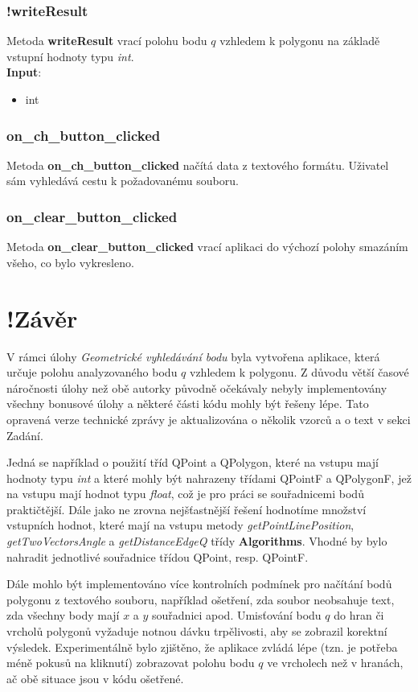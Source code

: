 \documentclass[a4paper, 12pt]{article}
\begin{document}
\subsubsection{!writeResult}
Metoda \textbf{writeResult} vrací polohu bodu $q$ vzhledem k polygonu na základě vstupní hodnoty typu \textit{int}.\\

\textbf{Input}:
\begin{itemize}
\item int
\end{itemize}

\subsubsection{on\_ch\_button\_clicked}
Metoda \textbf{on\_ch\_button\_clicked} načítá data z textového formátu. Uživatel sám vyhledává cestu k požadovanému souboru.

\subsubsection{on\_clear\_button\_clicked}
Metoda \textbf{on\_clear\_button\_clicked} vrací aplikaci do výchozí polohy smazáním všeho, co bylo vykresleno. 

\clearpage
\section{!Závěr}
V rámci úlohy \textit{Geometrické vyhledávání bodu} byla vytvořena aplikace, která určuje polohu analyzovaného bodu $q$ vzhledem k polygonu. Z důvodu větší časové náročnosti úlohy než obě autorky původně očekávaly nebyly implementovány všechny bonusové úlohy a některé části kódu mohly být řešeny lépe. Tato opravená verze technické zprávy je aktualizována o několik vzorců a o text v sekci Zadání. 

Jedná se například o použití tříd QPoint a QPolygon, které na vstupu mají hodnoty typu \textit{int} a které mohly být nahrazeny třídami QPointF a QPolygonF, jež na vstupu mají hodnot typu \textit{float}, což je pro práci se souřadnicemi bodů praktičtější. Dále jako ne zrovna nejšťastnější řešení hodnotíme množství vstupních hodnot, které mají na vstupu metody \textit{getPointLinePosition}, \textit{getTwoVectorsAngle} a \textit{getDistanceEdgeQ} třídy \textbf{Algorithms}. Vhodné by bylo nahradit jednotlivé souřadnice třídou QPoint, resp. QPointF. 

Dále mohlo být implementováno více kontrolních podmínek pro načítání bodů polygonu z textového souboru, například ošetření, zda soubor neobsahuje text, zda všechny body mají $x$ a $y$ souřadnici apod. Umisťování bodu $q$ do hran či vrcholů polygonů vyžaduje notnou dávku trpělivosti, aby se zobrazil korektní výsledek. Experimentálně bylo zjištěno, že aplikace zvládá lépe (tzn. je potřeba méně pokusů na kliknutí) zobrazovat polohu bodu $q$ ve vrcholech než v hranách, ač obě situace jsou v kódu ošetřené. 
\end{document}
